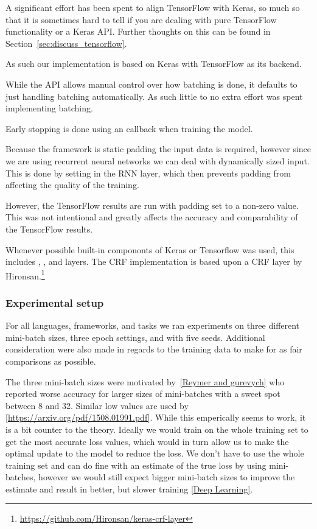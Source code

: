 A significant effort has been spent to align TensorFlow with Keras, so much so
that it is sometimes hard to tell if you are dealing with pure TensorFlow
functionality or a Keras API\@. Further thoughts on this can be found in
Section~\ref{sec:discuss_tensorflow}.

As such our implementation is based on Keras with TensorFlow as its
backend.

While the API allows manual control over how batching is done, it defaults to
just handling batching automatically. As such little to no extra effort was
spent implementing batching.

Early stopping is done using an  callback when training the
model.

Because the framework is static padding the input data is required, however
since we are using recurrent neural networks we can deal with dynamically sized
input. This is done by setting  in the RNN layer, which
then prevents padding from affecting the quality of the training.

However, the TensorFlow results are run with padding set to a non-zero value.
This was not intentional and greatly affects the accuracy and comparability of
the TensorFlow results.

Whenever possible built-in compononts of Keras or Tensorflow was used, this
includes , ,  and  layers.
The CRF implementation is based upon a CRF layer by
Hironsan.\footnote{\url{https://github.com/Hironsan/keras-crf-layer}}

\subsubsection{Experimental setup}

For all languages, frameworks, and tasks we ran experiments on three different
mini-batch sizes, three epoch settings, and with five seeds. Additional
consideration were also made in regards to the training data to make for as fair
comparisons as possible.

The three mini-batch sizes were motivated by~\ref{Reymer and gurevych} who
reported worse accuracy for larger sizes of mini-batches with a sweet spot
between 8 and 32. Similar low values are used by
\ref{https://arxiv.org/pdf/1508.01991.pdf}. While this emperically seems to
work, it is a bit counter to the theory. Ideally we would train on the whole
training set to get the most accurate loss values, which would in turn allow us
to make the optimal update to the model to reduce the loss. We don't have to use
the whole training set and can do fine with an estimate of the true loss by
using mini-batches, however we would still expect bigger mini-batch sizes to
improve the estimate and result in better, but slower training \ref{Deep
Learning}. 

